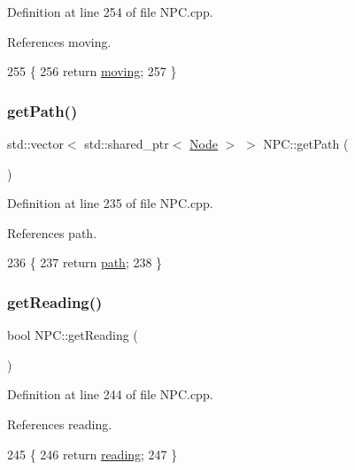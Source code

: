 Definition at line 254 of file N\+P\+C.\+cpp.



References moving.


\begin{DoxyCode}
255 \{
256     \textcolor{keywordflow}{return} \hyperlink{class_n_p_c_a4dfc6a89cae1301e7f722bbba67f3dbb}{moving};
257 \}
\end{DoxyCode}
\mbox{\label{class_n_p_c_aa9a219c85034a65f903f38781356b05b}} 
\subsubsection{\texorpdfstring{get\+Path()}{getPath()}}
{\footnotesize\ttfamily std\+::vector$<$ std\+::shared\+\_\+ptr$<$ \hyperlink{class_node}{Node} $>$ $>$ N\+P\+C\+::get\+Path (\begin{DoxyParamCaption}{ }\end{DoxyParamCaption})}



Definition at line 235 of file N\+P\+C.\+cpp.



References path.


\begin{DoxyCode}
236 \{
237     \textcolor{keywordflow}{return} \hyperlink{class_n_p_c_afdd6b1a6e4827259ec9d9fcd075cb099}{path};
238 \}
\end{DoxyCode}
\mbox{\label{class_n_p_c_a723183afdc657db3ec2ef88779e80968}} 
\subsubsection{\texorpdfstring{get\+Reading()}{getReading()}}
{\footnotesize\ttfamily bool N\+P\+C\+::get\+Reading (\begin{DoxyParamCaption}{ }\end{DoxyParamCaption})}



Definition at line 244 of file N\+P\+C.\+cpp.



References reading.


\begin{DoxyCode}
245 \{
246     \textcolor{keywordflow}{return} \hyperlink{class_n_p_c_a04d8f196cdd6de84f38131836d9c9cc7}{reading};
247 \}
\end{DoxyCode}
\mbox{\label{class_n_p_c_a759c42c8f2a75d2684157574cf3ddc65}} 
